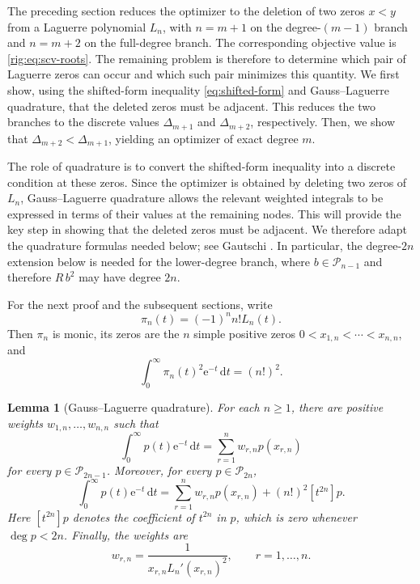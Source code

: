 \documentclass[11pt]{article}
\numberwithin{equation}{section}
\newtheorem{lemma}[theorem]{Lemma}
\theoremstyle{definition}
\theoremstyle{remark}
\newcommand{\Pcal}{\mathcal P}
\newcommand{\Lag}{L}
\newcommand{\dd}{\,\mathrm d}
\newcommand{\e}{\mathrm e}
\begin{document}
The preceding section reduces the optimizer to the deletion of two zeros $x<y$ from a Laguerre polynomial $\Lag_n$, with $n=m+1$ on the degree-$(m-1)$ branch and $n=m+2$ on the full-degree branch. The corresponding objective value is \eqref{rig:eq:scv-roots}.
The remaining problem is therefore to determine which pair of Laguerre zeros can occur and which such pair minimizes this quantity.
We first show, using the shifted-form inequality \eqref{eq:shifted-form} and Gauss--Laguerre quadrature, that the deleted zeros must be adjacent. This reduces the two branches to the discrete values $\Delta_{m+1}$ and $\Delta_{m+2}$, respectively. Then, we show that $\Delta_{m+2}<\Delta_{m+1}$, yielding an optimizer of exact degree $m$.




The role of quadrature is to convert the shifted-form inequality into a discrete condition at these zeros. Since the optimizer is obtained by deleting two zeros of $\Lag_n$, Gauss--Laguerre quadrature allows the relevant weighted integrals to be expressed in terms of their values at the remaining nodes. This will provide the key step in showing that the deleted zeros must be adjacent. We therefore adapt the quadrature formulas needed below; see Gautschi \cite[\S1.4.2]{gautschi2004}. In particular, the degree-$2n$ extension below is needed for the lower-degree branch, where $b\in\Pcal_{n-1}$ and therefore $R\,b^2$ may have degree $2n$.

For the next proof and the subsequent sections, write
\begin{equation}\label{adj:eq:monic-Laguerre}
 \pi_n(t)=(-1)^n n!\Lag_n(t).
\end{equation}
Then $\pi_n$ is monic, its zeros are the $n$ simple positive zeros $ 0<x_{1,n}<\cdots<x_{n,n}$,
and
\begin{equation}\label{adj:eq:monic-norm}
 \int_0^\infty \pi_n(t)^2\e^{-t}\dd t=(n!)^2.
\end{equation}

\begin{lemma}[Gauss--Laguerre quadrature]
\label{adj:lem:quadrature}
For each $n\geq1$, there are positive weights
$w_{1,n},\ldots,w_{n,n}$ such that
\begin{equation}\label{adj:eq:gauss-exact}
 \int_0^\infty p(t)\e^{-t}\dd t
 =
 \sum_{r=1}^n w_{r,n}p(x_{r,n})
\end{equation}
for every $p \in \Pcal_{2n-1}$.
Moreover, for every
$p\in\Pcal_{2n}$,
\begin{equation}\label{adj:eq:gauss-error}
 \int_0^\infty p(t)\e^{-t}\dd t
 =
 \sum_{r=1}^n w_{r,n}p(x_{r,n})
 +(n!)^2[t^{2n}]p.
\end{equation}
Here $[t^{2n}]p$ denotes the coefficient of $t^{2n}$ in $p$, which is zero whenever $\deg p<2n$.
Finally, the weights are
\begin{equation}\label{adj:eq:weight-derivative}
 w_{r,n}
 =
 \frac{1}{x_{r,n}\Lag_n'(x_{r,n})^2},
 \qquad r=1,\ldots,n.
\end{equation}
\end{lemma}
\end{document}
